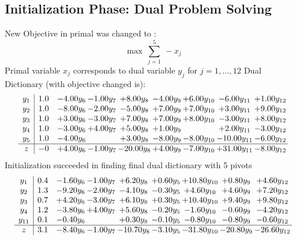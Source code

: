 \documentclass[8pt]{article}
\begin{document}
\subsection{Initialization Phase: Dual Problem Solving}
New Objective in primal was changed to : \[ \max\ \sum_{j=1}^{5}\ - x_j \] 
Primal variable $x_j$ corresponds to dual variable $y_j$ for $j = 1,\ldots,12$
Dual Dictionary (with objective changed is): 
\[\begin{array}{c| c c@{\hskip 2pt} c@{\hskip 2pt} c@{\hskip 2pt} c@{\hskip 2pt} c@{\hskip 2pt} c@{\hskip 2pt} c@{\hskip 2pt} }
 y_{1}   &  1.0 & -4.00 y_{6} & -1.00 y_{7} & +  8.00 y_{8} & -4.00 y_{9} & +  6.00 y_{10} & -6.00 y_{11} & +  1.00 y_{12}\\
 y_{2}   &  1.0 & -8.00 y_{6} & -2.00 y_{7} & -5.00 y_{8} & +  7.00 y_{9} & +  7.00 y_{10} & +  3.00 y_{11} & +  9.00 y_{12}\\
 y_{3}   &  1.0 & +  3.00 y_{6} & -3.00 y_{7} & +  7.00 y_{8} & +  7.00 y_{9} & +  8.00 y_{10} & -3.00 y_{11} & +  8.00 y_{12}\\
 y_{4}   &  1.0 & -3.00 y_{6} & +  4.00 y_{7} & +  5.00 y_{8} & +  1.00 y_{9} &   & +  2.00 y_{11} & -3.00 y_{12}\\
 y_{5}   &  1.0 & -4.00 y_{6} &   & +  3.00 y_{8} & -8.00 y_{9} & -8.00 y_{10} & -10.00 y_{11} & -6.00 y_{12}\\
\hline
z    &  -0 & +  4.00 y_{6} & -1.00 y_{7} & -20.00 y_{8} & +  4.00 y_{9} & -7.00 y_{10} & + 31.00 y_{11} & -8.00 y_{12}\\
\end{array}\]
Initialization succeeded in finding final dual dictionary with 5 pivots
\[\begin{array}{c| c c@{\hskip 2pt} c@{\hskip 2pt} c@{\hskip 2pt} c@{\hskip 2pt} c@{\hskip 2pt} c@{\hskip 2pt} c@{\hskip 2pt} }
 y_{1}   &  0.4 & -1.60 y_{6} & -1.00 y_{7} & +  6.20 y_{8} & +  0.60 y_{5} & + 10.80 y_{10} & +  0.80 y_{9} & +  4.60 y_{12}\\
 y_{2}   &  1.3 & -9.20 y_{6} & -2.00 y_{7} & -4.10 y_{8} & -0.30 y_{5} & +  4.60 y_{10} & +  4.60 y_{9} & +  7.20 y_{12}\\
 y_{3}   &  0.7 & +  4.20 y_{6} & -3.00 y_{7} & +  6.10 y_{8} & +  0.30 y_{5} & + 10.40 y_{10} & +  9.40 y_{9} & +  9.80 y_{12}\\
 y_{4}   &  1.2 & -3.80 y_{6} & +  4.00 y_{7} & +  5.60 y_{8} & -0.20 y_{5} & -1.60 y_{10} & -0.60 y_{9} & -4.20 y_{12}\\
 y_{11}   &  0.1 & -0.40 y_{6} &   & +  0.30 y_{8} & -0.10 y_{5} & -0.80 y_{10} & -0.80 y_{9} & -0.60 y_{12}\\
\hline
z    &  3.1 & -8.40 y_{6} & -1.00 y_{7} & -10.70 y_{8} & -3.10 y_{5} & -31.80 y_{10} & -20.80 y_{9} & -26.60 y_{12}\\
\end{array}\]
\end{document}
